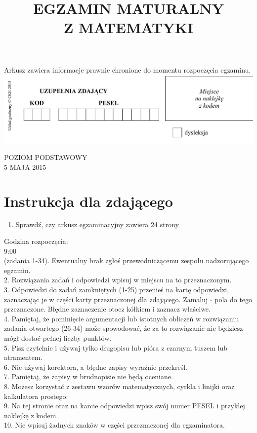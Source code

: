 \documentclass[10pt]{article}
\title{EGZAMIN MATURALNY \\
 Z MATEMATYKI }
\author{}
\date{}
\begin{document}
\maketitle
Arkusz zawiera informacje prawnie chronione do momentu rozpoczęcia egzaminu.\\
\includegraphics[max width=\textwidth, center]{2024_11_21_e19607c15353cb4d7e48g-01}

POZIOM PODSTAWOWY\\
5 MAJA 2015

\section*{Instrukcja dla zdającego}
\begin{enumerate}
  \item Sprawdź, czy arkusz egzaminacyjny zawiera 24 strony
\end{enumerate}

Godzina rozpoczęcia:\\
9:00\\
(zadania 1-34). Ewentualny brak zgłoś przewodniczącemu zespołu nadzorującego egzamin.\\
2. Rozwiązania zadań i odpowiedzi wpisuj w miejscu na to przeznaczonym.\\
3. Odpowiedzi do zadań zamkniętych (1-25) przenieś na kartę odpowiedzi, zaznaczając je w części karty przeznaczonej dla zdającego. Zamaluj \(\square\) pola do tego przeznaczone. Błędne zaznaczenie otocz kółkiem i zaznacz właściwe.\\
4. Pamiętaj, że pominięcie argumentacji lub istotnych obliczeń w rozwiązaniu zadania otwartego (26-34) może spowodować, że za to rozwiązanie nie będziesz mógł dostać pełnej liczby punktów.\\
5. Pisz czytelnie i używaj tylko długopisu lub pióra z czarnym tuszem lub atramentem.\\
6. Nie używaj korektora, a błędne zapisy wyraźnie przekreśl.\\
7. Pamiętaj, że zapisy w brudnopisie nie będą oceniane.\\
8. Możesz korzystać z zestawu wzorów matematycznych, cyrkla i linijki oraz kalkulatora prostego.\\
9. Na tej stronie oraz na karcie odpowiedzi wpisz swój numer PESEL i przyklej naklejkę z kodem.\\
10. Nie wpisuj żadnych znaków w części przeznaczonej dla egzaminatora.
\end{document}
